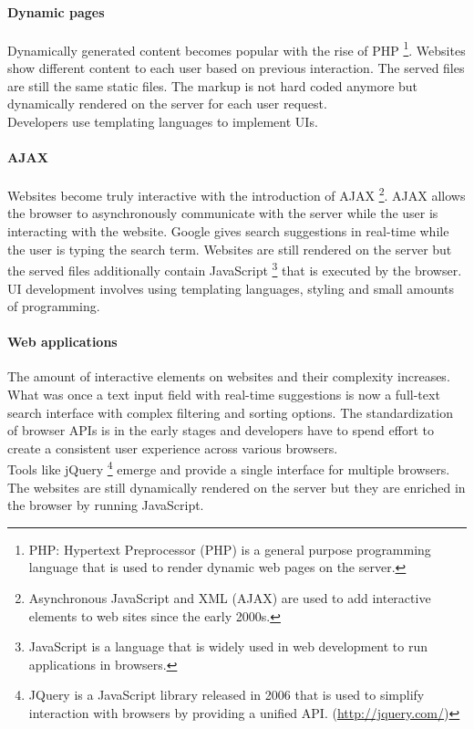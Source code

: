 \paragraph{Dynamic pages} Dynamically generated content becomes popular with the rise of PHP \footnote{PHP: Hypertext Preprocessor (PHP) is a general purpose programming language that is used to render dynamic web pages on the server.}. Websites show different content to each user based on previous interaction. The served files are still the same static files. The markup is not hard coded anymore but dynamically rendered on the server for each user request.
\\ Developers use templating languages to implement UIs.

\paragraph{AJAX} Websites become truly interactive with the introduction of AJAX \footnote{Asynchronous JavaScript and XML (AJAX) are used to add interactive elements to web sites since the early 2000s.}. AJAX allows the browser to asynchronously communicate with the server while the user is interacting with the website. Google gives search suggestions in real-time while the user is typing the search term. Websites are still rendered on the server but the served files additionally contain JavaScript \footnote{JavaScript is a language that is widely used in web development to run applications in browsers.} that is executed by the browser.
\\ UI development involves using templating languages, styling and small amounts of programming.

\paragraph{Web applications} The amount of interactive elements on websites and their complexity increases. What was once a text input field with real-time suggestions is now a full-text search interface with complex filtering and sorting options. The standardization of browser APIs is in the early stages and developers have to spend effort to create a consistent user experience across various browsers.
\\ Tools like jQuery \footnote{JQuery is a JavaScript library released in 2006 that is used to simplify interaction with browsers by providing a unified API. (\url{http://jquery.com/})} emerge and provide a single interface for multiple browsers. The websites are still dynamically rendered on the server but they are enriched in the browser by running JavaScript.

